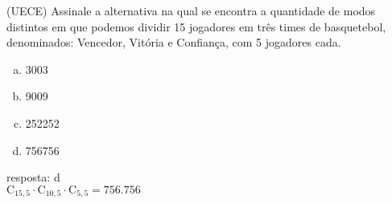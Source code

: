 \begin{ex}
(UECE) Assinale a alternativa na qual se encontra a quantidade de modos distintos em que podemos dividir 15 jogadores em três times de basquetebol, denominados: Vencedor, Vitória e Confiança, com 5 jogadores cada.
    \begin{enumerate}[(a)]
    \item 3003
    \item 9009
    \item 252252
    \item 756756
    \end{enumerate}
       \begin{sol}
       resposta: d  \\
       $\mathrm{C}_{{15},5}\cdot\mathrm{C}_{{10},5}\cdot\mathrm{C}_{5,5}=756.756$
       \end{sol}
\end{ex}